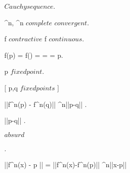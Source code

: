 \documentclass[../Main/main]{subfiles}
\begin{document}
{{{			 $ Cauchy sequence $.

			 \subset \R^n, \R^n $ complete $ \imp {} $ convergent $.

			f $ contractive $ \imp f $ continuous$.

			f(p) = f() =  =  = p.

			p $ fixed point $.

			[ p,q $ fixed points $ ]
			{
				||f^n(p) - f^n(q)|| \leq \lambda^n||p-q|| .

				||p-q|| .

				$absurd$
			}.

			{
				||f^n(x) - p || = ||f^n(x)-f^n(p)|| \leq \lambda^n||x-p|| 
			}
		}
	}
	

	
	
	
	
	
	
	
	
	
	
	
}
\end{document}
